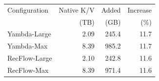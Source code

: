 \begin{tabular*}{\columnwidth}{@{\extracolsep{\fill}}lrrr@{}}
\toprule
Configuration & Native K/V & Added & Increase\\
 & (TB) & (GB) & (\%)\\
\midrule
Yambda-Large & 2.09 & 245.4 & 11.7\\
Yambda-Max & 8.39 & 985.2 & 11.7\\
RecFlow-Large & 2.10 & 242.8 & 11.6\\
RecFlow-Max & 8.39 & 971.4 & 11.6\\
\bottomrule
\end{tabular*}

